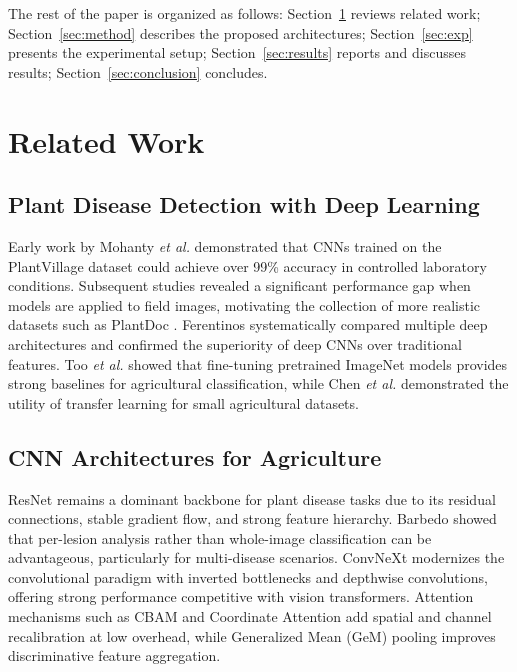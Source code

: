 \documentclass[conference]{IEEEtran}
\begin{document}
The rest of the paper is organized as follows: Section~\ref{sec:related} reviews related work; Section~\ref{sec:method} describes the proposed architectures; Section~\ref{sec:exp} presents the experimental setup; Section~\ref{sec:results} reports and discusses results; Section~\ref{sec:conclusion} concludes.

\section{Related Work}
\label{sec:related}

\subsection{Plant Disease Detection with Deep Learning}
Early work by Mohanty \textit{et al.} \cite{mohanty2016} demonstrated that CNNs trained on the PlantVillage dataset could achieve over 99\% accuracy in controlled laboratory conditions. Subsequent studies revealed a significant performance gap when models are applied to field images, motivating the collection of more realistic datasets such as PlantDoc \cite{plantdoc2020}. Ferentinos \cite{ferentinos2018} systematically compared multiple deep architectures and confirmed the superiority of deep CNNs over traditional features. Too \textit{et al.} \cite{too2019} showed that fine-tuning pretrained ImageNet models provides strong baselines for agricultural classification, while Chen \textit{et al.} \cite{chen2020} demonstrated the utility of transfer learning for small agricultural datasets.

\subsection{CNN Architectures for Agriculture}
ResNet \cite{resnet2016} remains a dominant backbone for plant disease tasks due to its residual connections, stable gradient flow, and strong feature hierarchy. Barbedo \cite{barbedo2019} showed that per-lesion analysis rather than whole-image classification can be advantageous, particularly for multi-disease scenarios. ConvNeXt \cite{convnext2022} modernizes the convolutional paradigm with inverted bottlenecks and depthwise convolutions, offering strong performance competitive with vision transformers. Attention mechanisms such as CBAM \cite{cbam2018} and Coordinate Attention \cite{coordatt2021} add spatial and channel recalibration at low overhead, while Generalized Mean (GeM) pooling \cite{gem2019} improves discriminative feature aggregation.
\end{document}
